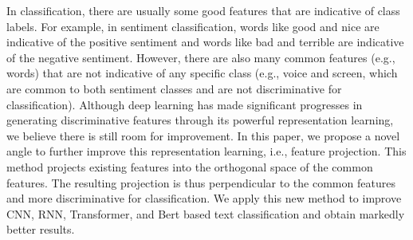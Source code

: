 In classification, there are usually some good features that are indicative of class labels. For example, in sentiment classification, words like good and nice are indicative of the positive sentiment and words like bad and terrible are indicative of the negative sentiment. However, there are also many common features (e.g., words) that are not indicative of any specific class (e.g., voice and screen, which are common to both sentiment classes and are not discriminative for classification). Although deep learning has made significant progresses in generating discriminative features through its powerful representation learning, we believe there is still room for improvement. In this paper, we propose a novel angle to further improve this representation learning, i.e., feature projection. This method projects existing features into the orthogonal space of the common features. The resulting projection is thus perpendicular to the common features and more discriminative for classification. We apply this new method to improve CNN, RNN, Transformer, and Bert based text classification and obtain markedly better results.
